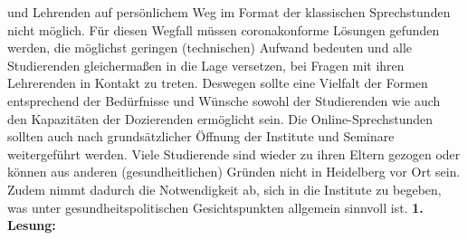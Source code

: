 {        und Lehrenden auf persönlichem Weg im Format der klassischen Sprechstunden nicht
        möglich. Für diesen Wegfall müssen coronakonforme Lösungen gefunden werden, die
        möglichst geringen (technischen) Aufwand bedeuten und alle Studierenden
        gleichermaßen in die Lage versetzen, bei Fragen mit ihren Lehrerenden in Kontakt zu
        treten. Deswegen sollte eine Vielfalt der Formen entsprechend der Bedürfnisse und
        Wünsche sowohl der Studierenden wie auch den Kapazitäten der Dozierenden
        ermöglicht sein. Die Online-Sprechstunden sollten auch nach grundsätzlicher Öffnung
        der Institute und Seminare weitergeführt werden. Viele Studierende sind wieder zu ihren 
        Eltern gezogen oder können aus anderen (gesundheitlichen) Gründen nicht in Heidelberg
        vor Ort sein. Zudem nimmt dadurch die Notwendigkeit ab, sich in die Institute zu
        begeben, was unter gesundheitspolitischen Gesichtspunkten allgemein sinnvoll ist.
    }{
        \textbf{1. Lesung:}
        \ul{}
    }{
    }
